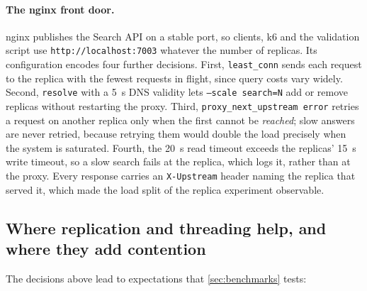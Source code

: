 \documentclass[10pt,a4paper]{article}
\newcommand{\code}[1]{\texttt{#1}}
\begin{document}
\paragraph{The nginx front door.}
nginx publishes the Search API on a stable port, so clients, k6 and the
validation script use \code{http://localhost:7003} whatever the number of
replicas. Its configuration encodes four further decisions. First,
\code{least\_conn} sends each request to the replica with the fewest requests
in flight, since query costs vary widely. Second, \code{resolve} with a 5~s DNS
validity lets \code{--scale search=N} add or remove replicas without
restarting the proxy. Third, \code{proxy\_next\_upstream error} retries a
request on another replica only when the first cannot be \emph{reached}; slow
answers are never retried, because retrying them would double the load
precisely when the system is saturated. Fourth, the 20~s read timeout exceeds
the replicas' 15~s write timeout, so a slow search fails at the replica, which
logs it, rather than at the proxy. Every response carries an
\code{X-Upstream} header naming the replica that served it, which made the load
split of the replica experiment observable.

\subsection{Where replication and threading help, and where they add contention}
\label{sec:decision-scaling}

The decisions above lead to expectations that \cref{sec:benchmarks} tests:
\end{document}

